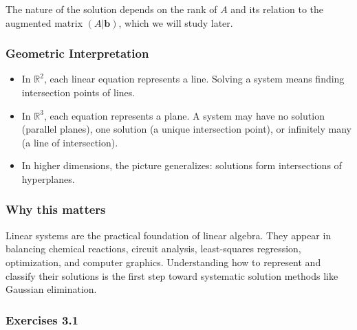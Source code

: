 \documentclass[
  12pt,
  a4paper,
]{article}
\begin{document}
The nature of the solution depends on the rank of \(A\) and its relation
to the augmented matrix \((A|\mathbf{b})\), which we will study later.

\subsubsection{Geometric
Interpretation}\label{geometric-interpretation-2}

\begin{itemize}
\item
  In \(\mathbb{R}^2\), each linear equation represents a line. Solving a
  system means finding intersection points of lines.
\item
  In \(\mathbb{R}^3\), each equation represents a plane. A system may
  have no solution (parallel planes), one solution (a unique
  intersection point), or infinitely many (a line of intersection).
\item
  In higher dimensions, the picture generalizes: solutions form
  intersections of hyperplanes.
\end{itemize}

\subsubsection{Why this matters}\label{why-this-matters-8}

Linear systems are the practical foundation of linear algebra. They
appear in balancing chemical reactions, circuit analysis, least-squares
regression, optimization, and computer graphics. Understanding how to
represent and classify their solutions is the first step toward
systematic solution methods like Gaussian elimination.

\subsubsection{Exercises 3.1}\label{exercises-31}
\end{document}
